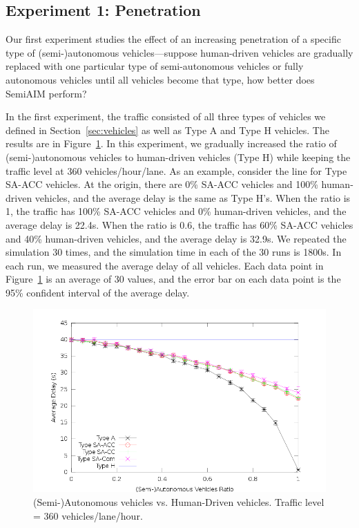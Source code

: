 \subsection{Experiment 1: Penetration}

Our first experiment studies the effect of an increasing penetration
of a specific type of (semi-)autonomous vehicles---suppose
human-driven vehicles are gradually replaced with one particular type
of semi-autonomous vehicles or fully autonomous vehicles until all
vehicles become that type, how better does SemiAIM perform?

In the first experiment, the traffic consisted of all three types of
vehicles we defined in Section~\ref{sec:vehicles} as well as Type A
and Type H vehicles.  The results are in Figure~\ref{fig:two360}.  In
this experiment, we gradually increased the ratio of (semi-)autonomous
vehicles to human-driven vehicles (Type H) while keeping the traffic
level at 360 vehicles/hour/lane. As an example, consider the line for
Type SA-ACC vehicles. At the origin, there are 0\% SA-ACC vehicles and
100\% human-driven vehicles, and the average delay is the same as Type
H's.  When the ratio is 1, the traffic has 100\% SA-ACC vehicles and
0\% human-driven vehicles, and the average delay is 22.4s.
When the ratio is 0.6, the traffic has 60\% SA-ACC vehicles and 40\%
human-driven vehicles, and the average delay is 32.9s.  We
repeated the simulation 30 times, and the simulation time in each of
the 30 runs is 1800s.  In each run, we measured the average
delay of all vehicles.  Each data point in Figure~\ref{fig:two360} is
an average of 30 values, and the error bar on each data point is the
95\% confident interval of the average delay.

\begin{figure}
\centering
\includegraphics[width=0.8\columnwidth]{figures/figure_1.png}
\caption{(Semi-)Autonomous vehicles vs. Human-Driven vehicles. Traffic
level = 360 vehicles/lane/hour.}
\label{fig:two360}
\end{figure}

